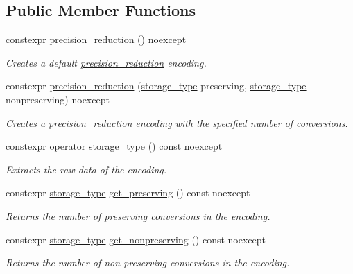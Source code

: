 \subsection*{Public Member Functions}
\begin{DoxyCompactItemize}
\item 
constexpr \hyperlink{classgko_1_1precision__reduction_a371fe028770edee40c013d1a45365aa2}{precision\+\_\+reduction} () noexcept
\begin{DoxyCompactList}\small\item\em Creates a default \hyperlink{classgko_1_1precision__reduction}{precision\+\_\+reduction} encoding. \end{DoxyCompactList}\item 
constexpr \hyperlink{classgko_1_1precision__reduction_ae4d4355a6614ced4fc611619da7b09f2}{precision\+\_\+reduction} (\hyperlink{classgko_1_1precision__reduction_a2a1a94a27fa69b4cc321136b56e7b7d9}{storage\+\_\+type} preserving, \hyperlink{classgko_1_1precision__reduction_a2a1a94a27fa69b4cc321136b56e7b7d9}{storage\+\_\+type} nonpreserving) noexcept
\begin{DoxyCompactList}\small\item\em Creates a \hyperlink{classgko_1_1precision__reduction}{precision\+\_\+reduction} encoding with the specified number of conversions. \end{DoxyCompactList}\item 
constexpr \hyperlink{classgko_1_1precision__reduction_a3ee4da03be089565f7ab91b553d7738f}{operator storage\+\_\+type} () const noexcept
\begin{DoxyCompactList}\small\item\em Extracts the raw data of the encoding. \end{DoxyCompactList}\item 
constexpr \hyperlink{classgko_1_1precision__reduction_a2a1a94a27fa69b4cc321136b56e7b7d9}{storage\+\_\+type} \hyperlink{classgko_1_1precision__reduction_ad709bd9bdd9b4ec27f75fc213aef51df}{get\+\_\+preserving} () const noexcept
\begin{DoxyCompactList}\small\item\em Returns the number of preserving conversions in the encoding. \end{DoxyCompactList}\item 
constexpr \hyperlink{classgko_1_1precision__reduction_a2a1a94a27fa69b4cc321136b56e7b7d9}{storage\+\_\+type} \hyperlink{classgko_1_1precision__reduction_a909a01025fd490d4658abd7c5791685d}{get\+\_\+nonpreserving} () const noexcept
\begin{DoxyCompactList}\small\item\em Returns the number of non-\/preserving conversions in the encoding. \end{DoxyCompactList}\end{DoxyCompactItemize}
